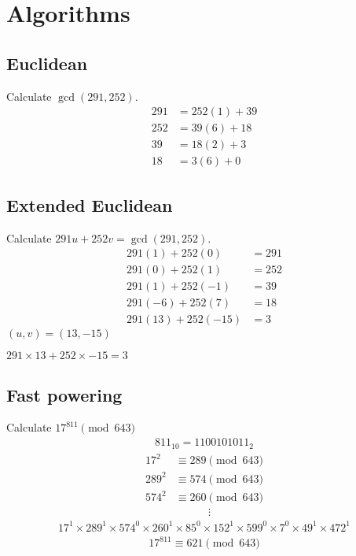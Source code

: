 \documentclass{article}
\begin{document}
\section*{Algorithms}

\subsection*{Euclidean}
Calculate $\gcd(291, 252)$.
\begin{align*}
    291 &= 252(1) + 39        \\
    252 &= 39(6)  + 18        \\
    39  &= 18(2)  + \boxed{3} \\
    18  &= 3(6)   + 0
\end{align*}

\subsection*{Extended Euclidean}
Calculate $291u + 252v = \gcd(291, 252)$.
\begin{align*}
    291(1)  + 252(0)   &= 291 \\
    291(0)  + 252(1)   &= 252 \\
    291(1)  + 252(-1)  &= 39  \\
    291(-6) + 252(7)   &= 18  \\
    291(13) + 252(-15) &= 3
\end{align*}
$(u, v) = (13, -15)$

$291 \times 13 + 252 \times -15 = 3$

\subsection*{Fast powering}
Calculate $17^{811} \pmod{643}$
\begin{align*}
    811_{10} = 1100101011_2
\end{align*}
\begin{align*}
    17^2 &\equiv 289 \pmod{643} \\
    289^2 &\equiv 574 \pmod{643} \\
    574^2 &\equiv 260 \pmod{643} \\
    & \qquad \quad \vdots
\end{align*}
\begin{align*}
    17^{1} \times 289^{1} \times 574^{0} \times 260^{1} \times 85^{0} \times 152^{1} \times 599^{0} \times 7^{0} \times 49^{1} \times 472^{1}
\end{align*}
\begin{align*}
    17^{811} \equiv 621 \pmod{643}
\end{align*}
\end{document}
